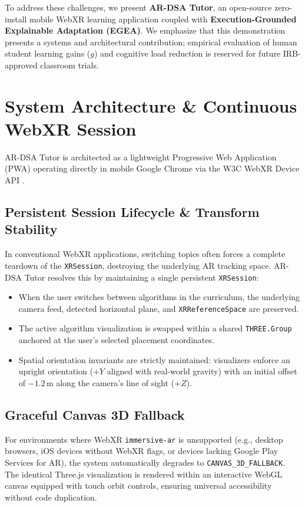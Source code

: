 \documentclass[conference]{IEEEtran}
\begin{document}
To address these challenges, we present \textbf{AR-DSA Tutor}, an open-source zero-install mobile WebXR learning application coupled with \textbf{Execution-Grounded Explainable Adaptation (EGEA)}. We emphasize that this demonstration presents a systems and architectural contribution; empirical evaluation of human student learning gains ($g$) and cognitive load reduction is reserved for future IRB-approved classroom trials.

\section{System Architecture \& Continuous WebXR Session}
AR-DSA Tutor is architected as a lightweight Progressive Web Application (PWA) operating directly in mobile Google Chrome via the W3C WebXR Device API \cite{w3c2022webxr}.

\subsection{Persistent Session Lifecycle \& Transform Stability}
In conventional WebXR applications, switching topics often forces a complete teardown of the \texttt{XRSession}, destroying the underlying AR tracking space. AR-DSA Tutor resolves this by maintaining a single persistent \texttt{XRSession}:
\begin{itemize}
    \item When the user switches between algorithms in the curriculum, the underlying camera feed, detected horizontal plane, and \texttt{XRReferenceSpace} are preserved.
    \item The active algorithm visualization is swapped within a shared \texttt{THREE.Group} anchored at the user's selected placement coordinates.
    \item Spatial orientation invariants are strictly maintained: visualizers enforce an upright orientation ($+Y$ aligned with real-world gravity) with an initial offset of $-1.2$\,m along the camera's line of sight ($+Z$).
\end{itemize}

\subsection{Graceful Canvas 3D Fallback}
For environments where WebXR \texttt{immersive-ar} is unsupported (e.g., desktop browsers, iOS devices without WebXR flags, or devices lacking Google Play Services for AR), the system automatically degrades to \texttt{CANVAS\_3D\_FALLBACK}. The identical Three.js visualization is rendered within an interactive WebGL canvas equipped with touch orbit controls, ensuring universal accessibility without code duplication.
\end{document}
